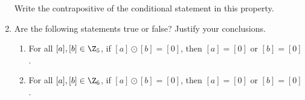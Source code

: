 \begin{prog}
\begin{enumerate}

Write the contrapositive of the conditional statement in this property.

\item Are the following statements true or false? Justify your conclusions.
\begin{enumerate}
\item For all  $[ a ], [ b ] \in \Z_5 $, if  
$[ a ] \odot [ b ] = [ 0 ]$, then  
$[ a ] = [ 0 ]$ or  $[ b ] = [ 0 ]$.
\item For all  $[ a ], [ b ] \in \Z_6 $, if  
$[ a ] \odot [ b ] = [ 0 ]$, then 
$[ a ] = [ 0 ]$ or  $[ b ] = [ 0 ]$.
\end{enumerate}
\end{enumerate}
\end{prog}
\hbreak

\endinput
